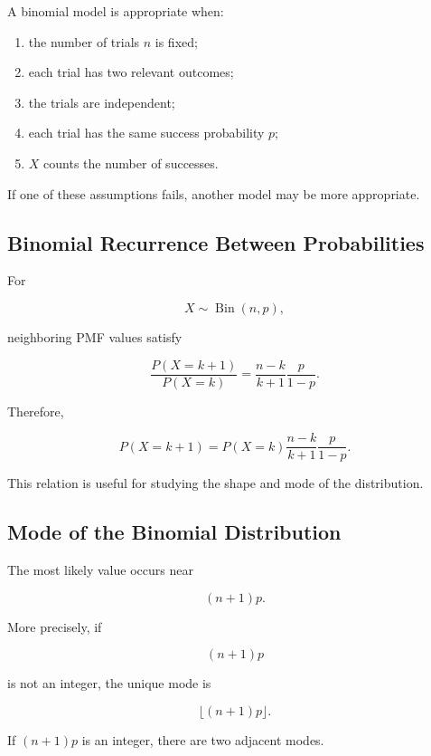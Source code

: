 A binomial model is appropriate when:

\begin{enumerate}
    \item the number of trials \(n\) is fixed;
    \item each trial has two relevant outcomes;
    \item the trials are independent;
    \item each trial has the same success probability \(p\);
    \item \(X\) counts the number of successes.
\end{enumerate}

If one of these assumptions fails, another model may be more appropriate.

\subsection{Binomial Recurrence Between Probabilities}
\label{subsec:binomial-probability-ratio}

For

\[
X\sim\operatorname{Bin}(n,p),
\]

neighboring PMF values satisfy

\[
\frac{P(X=k+1)}{P(X=k)}
=
\frac{n-k}{k+1}
\frac{p}{1-p}.
\]

Therefore,

\[
\boxed{
P(X=k+1)
=
P(X=k)
\frac{n-k}{k+1}
\frac{p}{1-p}.
}
\]

This relation is useful for studying the shape and mode of the
distribution.

\subsection{Mode of the Binomial Distribution}
\label{subsec:binomial-mode}

The most likely value occurs near

\[
(n+1)p.
\]

More precisely, if

\[
(n+1)p
\]

is not an integer, the unique mode is

\[
\boxed{
\lfloor(n+1)p\rfloor.
}
\]

If \((n+1)p\) is an integer, there are two adjacent modes.

